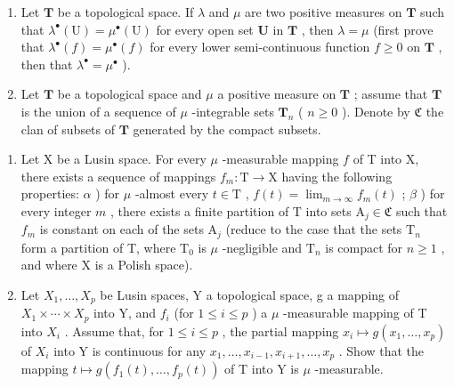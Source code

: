 \begin{enumerate}
\def\labelenumi{\arabic{enumi})}
\setcounter{enumi}{8}
\item
  Let \(\mathbf{T}\) be a topological space. If \(\lambda\) and \(\mu\) are two positive measures on \(\mathbf{T}\) such that \(\lambda^{\bullet}(\mathrm{U}) = \mu^{\bullet}(\mathrm{U})\) for every open set \(\mathbf{U}\) in \(\mathbf{T}\) , then \(\lambda = \mu\) (first prove that \(\lambda^{\bullet}(f) = \mu^{\bullet}(f)\) for every lower semi-continuous function \(f \geqslant 0\) on \(\mathbf{T}\) , then that \(\lambda^{\bullet} = \mu^{\bullet}\) ).
\item
  Let \(\mathbf{T}\) be a topological space and \(\mu\) a positive measure on \(\mathbf{T}\) ; assume that \(\mathbf{T}\) is the union of a sequence of \(\mu\) -integrable sets \(\mathbf{T}_n\) ( \(n \geqslant 0\) ). Denote by \(\mathfrak{C}\) the clan of subsets of \(\mathbf{T}\) generated by the compact subsets.
\end{enumerate}

\begin{enumerate}
\def\labelenumi{\alph{enumi})}
\item
  Let X be a Lusin space. For every \(\mu\) -measurable mapping \(f\) of T into X, there exists a sequence of mappings \(f_m: \mathrm{T} \to \mathrm{X}\) having the following properties: \(\alpha\) ) for \(\mu\) -almost every \(t \in \mathrm{T}\) , \(f(t) = \lim_{m \to \infty} f_m(t)\) ; \(\beta\) ) for every integer \(m\) , there exists a finite partition of T into sets \(\mathrm{A}_j \in \mathfrak{C}\) such that \(f_m\) is constant on each of the sets \(\mathrm{A}_j\) (reduce to the case that the sets \(\mathrm{T}_n\) form a partition of T, where \(\mathrm{T}_0\) is \(\mu\) -negligible and \(\mathrm{T}_n\) is compact for \(n \geqslant 1\) , and where X is a Polish space).
\item
  Let \(X_{1},\ldots,X_{p}\) be Lusin spaces, Y a topological space, g a mapping of \(X_{1}\times\cdots\times X_{p}\) into Y, and \(f_{i}\) (for \(1\leqslant i\leqslant p\) ) a \(\mu\) -measurable mapping of T into \(X_{i}\) . Assume that, for \(1\leqslant i\leqslant p\) , the partial mapping \(x_{i}\mapsto g(x_{1},\ldots,x_{p})\) of \(X_{i}\) into Y is continuous for any \(x_{1},\ldots,x_{i-1},x_{i+1},\ldots,x_{p}\) . Show that the mapping \(t\mapsto g(f_{1}(t),\ldots,f_{p}(t))\) of T into Y is \(\mu\) -measurable.
\end{enumerate}

